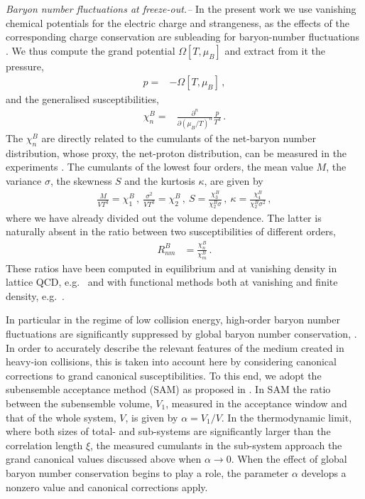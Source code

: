 \documentclass[reprint,twocolumn,superscriptaddress,preprintnumbers,amsmath,amssymb,aps,prd,floatfix]{revtex4-2}
\begin{document}
\emph{Baryon number fluctuations at freeze-out.--} 
%
In the present work we use vanishing chemical potentials for the electric charge and strangeness, as the effects of the corresponding charge conservation are subleading for baryon-number fluctuations \cite{Fu:2018qsk, Fu:2018swz, Wen:2019ruz}. We thus compute the grand potential $\Omega[T, \mu_B]$ and extract from it the pressure,
%
\begin{align}
    p=&-\Omega[T,\mu_B]\,,
    \label{eq:pres}
\end{align}
%
and the generalised susceptibilities,
%
\begin{align}
    \chi_{n}^{B}=&\frac{\partial^{n}}{\partial(\mu_{B}/T)^{n}}\frac{p}{T^{4}}\,. 
    \label{eq:chi-def}
\end{align}
%
The $\chi_{n}^{B}$ are directly related to the cumulants of the net-baryon number distribution, whose proxy, the net-proton distribution, can be measured in the experiments \cite{Hatta:2003wn}. The cumulants of the lowest four orders, the mean value $M$, the variance $\sigma$, the skewness $S$ and the kurtosis $\kappa$, are given by  
%
\begin{align}
 \frac{M}{VT^3}=\chi_1^{B}\,,\ \frac{\sigma^2}{VT^3}=\chi_2^{B}\,,\   
S=\frac{\chi_3^{B}}{\chi_2^{B}\sigma}\,,\  \kappa=\frac{\chi_4^{B}}{\chi_2^{B}\sigma^2}\,, 
\end{align}
%
where we have already divided out the volume dependence. The latter is naturally absent in the ratio between two susceptibilities of different orders, 
%
\begin{align}
    R_{nm}^{B}&=\frac{\chi_n^{B}}{\chi_m^{B}}\,.
    \label{eq:Rnm}
\end{align}
%
These ratios have been computed in equilibrium and at vanishing density in lattice QCD, e.g.~\cite{Bazavov:2012vg, Borsanyi:2013hza, Borsanyi:2014ewa, Bazavov:2020bjn} and with functional methods both at vanishing and finite density, e.g.~\cite{Fu:2015naa, Fu:2015amv, Fu:2016tey, Almasi:2017bhq, Isserstedt:2019pgx, Fu:2021oaw}. 

In particular in the regime of low collision energy, high-order baryon number fluctuations are significantly suppressed by global baryon number conservation, \cite{Bzdak:2012an, Vovchenko:2020tsr, Braun-Munzinger:2020jbk}. In order to accurately describe the relevant features of the medium created in heavy-ion collisions, this is taken into account here by considering canonical corrections to grand canonical susceptibilities. To this end, we adopt the subensemble acceptance method (SAM) as proposed in \cite{Vovchenko:2020tsr}. In SAM the ratio between the subensemble volume, $V_1$, measured in the acceptance window and that of the whole system, $V$, is given by $\alpha=V_1/V$. In the thermodynamic limit, where both sizes of total- and sub-systems are significantly larger than the correlation length $\xi$, the measured cumulants in the sub-system approach the grand canonical values discussed above when $\alpha \to 0$. When the effect of global baryon number conservation begins to play a role, the parameter $\alpha$ develops a nonzero value and canonical corrections apply. 
\end{document}
